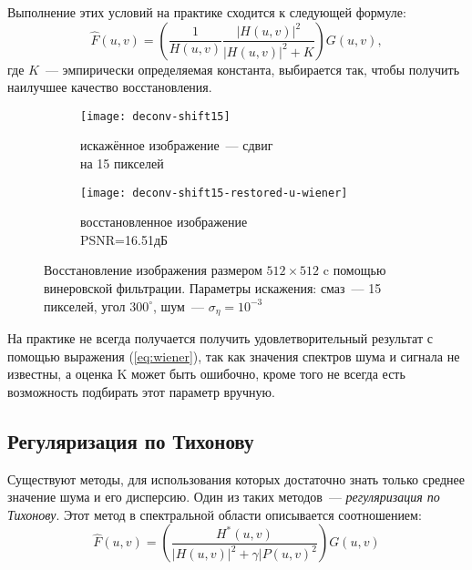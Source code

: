 Выполнение этих условий на практике сходится к следующей формуле:
\begin{equation}\label{eq:wiener}
\hat{F}(u,v)=\left(\frac{1}{H(u,v)}\frac{|H(u,v)|^2}{|H(u,v)|^2+K}\right)G(u,v),
\end{equation}
где $K$~--- эмпирически определяемая константа, выбирается так, чтобы получить наилучшее качество восстановления.

\begin{figure}[h!]
	\begin{subfigure}[b]{0.5\textwidth}
		\texttt{[image: deconv-shift15]}
		\caption{искажённое изображение~--- сдвиг \\на 15 пикселей}
		\label{fig:astroShift15}
	\end{subfigure}%
	\begin{subfigure}[b]{0.5\textwidth}
		\texttt{[image: deconv-shift15-restored-u-wiener]}
		\caption{восстановленное изображение\\ PSNR=16.51дБ}
		\label{fig:astroWienerRestored}
	\end{subfigure}%
	\caption{Восстановление изображения размером $512\times 512$ c помощью винеровской фильтрации. Параметры искажения: смаз~--- 15 пикселей, угол $300^\circ$, шум~--- $\sigma_\eta=10^{-3}$}
\end{figure}
На практике не всегда получается получить удовлетворительный результат с помощью выражения (\ref{eq:wiener}), так как значения спектров шума и сигнала не известны, а оценка K может быть ошибочно, кроме того не всегда есть возможность подбирать этот параметр вручную.

\subsection{Регуляризация по Тихонову}
Существуют методы, для использования которых достаточно знать только среднее значение шума и его дисперсию. Один из таких методов~--- \textit{регуляризация по Тихонову}. Этот метод в спектральной области описывается соотношением\cite[стр.~418]{gonsalesDigital2012}:
\begin{equation}\label{eq:tikhonov}
\hat{F}(u,v) = \left(\frac{H^*(u,v)}{|H(u,v)|^2 + \gamma|P(u,v)^2}\right)G(u,v)
\end{equation}


